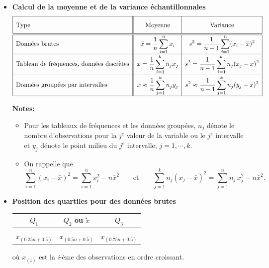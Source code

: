 \documentclass[12pt,french]{article}
\begin{document}
\begin{itemize}

\item
{\bf Calcul de la moyenne et de la variance \'echantillonnales}
\begin{displaymath}
{\renewcommand{\arraystretch}{2}
\begin{array}{|l||c|c|}
\hline
\mbox{Type}& \mbox{Moyenne}& \mbox {Variance}\\[.10cm]


\hline\hline
\mbox{Donn\'ees brutes}& \displaystyle \bar{x}=\frac{1}{n}\sum_{i=1}^
{n}x_{i}& \displaystyle  s^{2} = \frac{1}{n-1}\sum_{i=1}^{n}(x_{i}-
\bar{x})^{2}\\[.20cm]

\hline \mbox{Tableau de fr\'equences, donn\'ees discr\`etes} &
\displaystyle \bar{x} = \frac{1}{n} \sum_{j=1}^{k}n_{j}x_{j}&
\displaystyle  s^{2} = \frac{1}{n-1}
\sum_{j=1}^{k}n_{j} (x_{j}-\bar{x})^{2}\\[.10cm]


\hline \mbox{Donn\'ees group\'ees par intervalles} &
\displaystyle \bar{x} \approx \frac{1}{n} \sum_{j=1}^{k}n_{j}y_{j}&
\displaystyle  s^{2} \approx \frac{1}{n-1}
\sum_{j=1}^{k}n_{j} (y_{j}-\bar{x})^{2}\\[.10cm]
\hline


\end{array}}
\end{displaymath}

\textbf{Notes:}
\begin{itemize}
\item Pour les tableaux de fr\'equences et les donn\'ees group\'ees, $n_j$ d\'enote
le nombre d'observations pour la $j^e$ valeur de la variable
ou le $j^e$ intervalle et $y_j$ d\'enote le point milieu du $j^e$ intervalle, $j = 1, \cdots, k$.

\item
On rappelle que
$$
\sum\limits_{i=1}^n (x_i-\bar{x})^2=\sum\limits_{i=1}^n
x_i^2-n\bar{x}^2 \; \; \; \; \; \;  \mbox{ et } \; \; \; \; \; \;  \sum\limits_{j=1}^k n_j
(x_j-\bar{x})^2= \sum\limits_{j=1}^n n_j\, x_j^2-n\bar{x}^2.
$$
\end{itemize}


\item {\bf Position des quartiles pour des donn\'ees brutes}
\vspace{0.2 cm}


\begin{tabular}{|c|c|c|}
\hline
$Q_1$ & $Q_2$ ou $\tilde{x}$ & $Q_3$\\
\hline
 & &  \\[-0.4 cm]
$x_{(0.25n + 0.5)}$ & $x_{(0.5n + 0.5)}$ & $x_{(0.75n + 0.5)}$ \\
\hline
\end{tabular}
 o\`u  $x_{(i)}$ est la {\it i}-\`eme des observations en ordre croissant.\\


\end{itemize}
\end{document}
